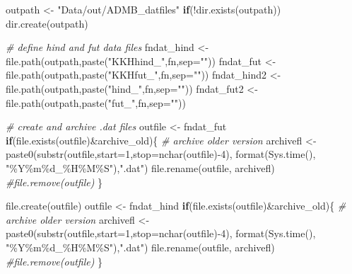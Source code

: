 \documentclass[
]{article}
\newenvironment{Shaded}{\begin{snugshade}}{\end{snugshade}}
\newcommand{\AttributeTok}[1]{\textcolor[rgb]{0.77,0.63,0.00}{#1}}
\newcommand{\CommentTok}[1]{\textcolor[rgb]{0.56,0.35,0.01}{\textit{#1}}}
\newcommand{\ControlFlowTok}[1]{\textcolor[rgb]{0.13,0.29,0.53}{\textbf{#1}}}
\newcommand{\DecValTok}[1]{\textcolor[rgb]{0.00,0.00,0.81}{#1}}
\newcommand{\FunctionTok}[1]{\textcolor[rgb]{0.00,0.00,0.00}{#1}}
\newcommand{\NormalTok}[1]{#1}
\newcommand{\OtherTok}[1]{\textcolor[rgb]{0.56,0.35,0.01}{#1}}
\newcommand{\SpecialCharTok}[1]{\textcolor[rgb]{0.00,0.00,0.00}{#1}}
\newcommand{\StringTok}[1]{\textcolor[rgb]{0.31,0.60,0.02}{#1}}
\begin{document}
\begin{Shaded}
\begin{Highlighting}[]
\NormalTok{outpath     }\OtherTok{\textless{}{-}} \StringTok{"Data/out/ADMB\_datfiles"}
\ControlFlowTok{if}\NormalTok{(}\SpecialCharTok{!}\FunctionTok{dir.exists}\NormalTok{(outpath)) }\FunctionTok{dir.create}\NormalTok{(outpath)}

\CommentTok{\# define hind and fut data files}
\NormalTok{fndat\_hind  }\OtherTok{\textless{}{-}} \FunctionTok{file.path}\NormalTok{(outpath,}\FunctionTok{paste}\NormalTok{(}\StringTok{"KKHhind\_"}\NormalTok{,fn,}\AttributeTok{sep=}\StringTok{""}\NormalTok{))}
\NormalTok{fndat\_fut   }\OtherTok{\textless{}{-}} \FunctionTok{file.path}\NormalTok{(outpath,}\FunctionTok{paste}\NormalTok{(}\StringTok{"KKHfut\_"}\NormalTok{,fn,}\AttributeTok{sep=}\StringTok{""}\NormalTok{))}
\NormalTok{fndat\_hind2 }\OtherTok{\textless{}{-}} \FunctionTok{file.path}\NormalTok{(outpath,}\FunctionTok{paste}\NormalTok{(}\StringTok{"hind\_"}\NormalTok{,fn,}\AttributeTok{sep=}\StringTok{""}\NormalTok{))}
\NormalTok{fndat\_fut2  }\OtherTok{\textless{}{-}} \FunctionTok{file.path}\NormalTok{(outpath,}\FunctionTok{paste}\NormalTok{(}\StringTok{"fut\_"}\NormalTok{,fn,}\AttributeTok{sep=}\StringTok{""}\NormalTok{))}

\CommentTok{\# create and archive .dat files}
\NormalTok{outfile    }\OtherTok{\textless{}{-}}\NormalTok{ fndat\_fut}
\ControlFlowTok{if}\NormalTok{(}\FunctionTok{file.exists}\NormalTok{(outfile)}\SpecialCharTok{\&}\NormalTok{archive\_old)\{   }
  \CommentTok{\# archive older version}
\NormalTok{  archivefl }\OtherTok{\textless{}{-}} \FunctionTok{paste0}\NormalTok{(}\FunctionTok{substr}\NormalTok{(outfile,}\AttributeTok{start=}\DecValTok{1}\NormalTok{,}\AttributeTok{stop=}\FunctionTok{nchar}\NormalTok{(outfile)}\SpecialCharTok{{-}}\DecValTok{4}\NormalTok{),}
                      \FunctionTok{format}\NormalTok{(}\FunctionTok{Sys.time}\NormalTok{(), }\StringTok{"\%Y\%m\%d\_\%H\%M\%S"}\NormalTok{),}\StringTok{".dat"}\NormalTok{)}
  \FunctionTok{file.rename}\NormalTok{(outfile, archivefl)}
  \CommentTok{\#file.remove(outfile)}
\NormalTok{\}}

\FunctionTok{file.create}\NormalTok{(outfile)}
\NormalTok{outfile  }\OtherTok{\textless{}{-}}\NormalTok{ fndat\_hind}
\ControlFlowTok{if}\NormalTok{(}\FunctionTok{file.exists}\NormalTok{(outfile)}\SpecialCharTok{\&}\NormalTok{archive\_old)\{   }
  \CommentTok{\# archive older version}
\NormalTok{  archivefl }\OtherTok{\textless{}{-}} \FunctionTok{paste0}\NormalTok{(}\FunctionTok{substr}\NormalTok{(outfile,}\AttributeTok{start=}\DecValTok{1}\NormalTok{,}\AttributeTok{stop=}\FunctionTok{nchar}\NormalTok{(outfile)}\SpecialCharTok{{-}}\DecValTok{4}\NormalTok{),}
                      \FunctionTok{format}\NormalTok{(}\FunctionTok{Sys.time}\NormalTok{(), }\StringTok{"\%Y\%m\%d\_\%H\%M\%S"}\NormalTok{),}\StringTok{".dat"}\NormalTok{)}
  \FunctionTok{file.rename}\NormalTok{(outfile, archivefl)}
  \CommentTok{\#file.remove(outfile)}
\NormalTok{\}}


\end{Highlighting}
\end{Shaded}
\end{document}
